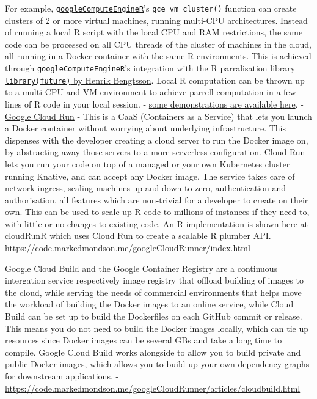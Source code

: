 For example,
\href{https://CRAN.R-project.org/package=googleComputeEngineR}{\texttt{googleComputeEngineR}}'s
\texttt{gce\_vm\_cluster()} function can create clusters of 2 or more
virtual machines, running multi-CPU architectures. Instead of running a
local R script with the local CPU and RAM restrictions, the same code
can be processed on all CPU threads of the cluster of machines in the
cloud, all running in a Docker container with the same R environments.
This is achieved through \texttt{googleComputeEngineR}'s integration
with the R parralisation library
\href{https://CRAN.R-project.org/package=future}{\texttt{library(future)}
by Henrik Bengtsson}. Local R computation can be thrown up to a
multi-CPU and VM environment to achieve parrell computation in a few
lines of R code in your local session. -
\href{https://cloudyr.github.io/googleComputeEngineR/articles/massive-parallel.html}{some
demonstrations are available here}. - \href{https://cloud.run}{Google
Cloud Run} - This is a CaaS (Containers as a Service) that lets you
launch a Docker container without worrying about underlying
infrastructure. This dispenses with the developer creating a cloud
server to run the Docker image on, by abstracting away those servers to
a more serverless configuration. Cloud Run lets you run your code on top
of a managed or your own Kubernetes cluster running Knative, and can
accept any Docker image. The service takes care of network ingress,
scaling machines up and down to zero, authentication and authorisation,
all features which are non-trivial for a developer to create on their
own. This can be used to scale up R code to millions of instances if
they need to, with little or no changes to existing code. An R
implementation is shown here at
\href{https://github.com/MarkEdmondson1234/cloudRunR}{cloudRunR} which
uses Cloud Run to create a scalable R plumber API.
\url{https://code.markedmondson.me/googleCloudRunner/index.html}

\href{https://cloud.google.com/cloud-build/}{Google Cloud Build} and the
Google Container Registry are a continuous intergation service
respectively image registry that offload building of images to the
cloud, while serving the needs of commercial environments that helps
move the workload of building the Docker images to an online service,
while Cloud Build can be set up to build the Dockerfiles on each GitHub
commit or release. This means you do not need to build the Docker images
locally, which can tie up resources since Docker images can be several
GBs and take a long time to compile. Google Cloud Build works alongside
to allow you to build private and public Docker images, which allows you
to build up your own dependency graphs for downstream applications. -
\url{https://code.markedmondson.me/googleCloudRunner/articles/cloudbuild.html}


